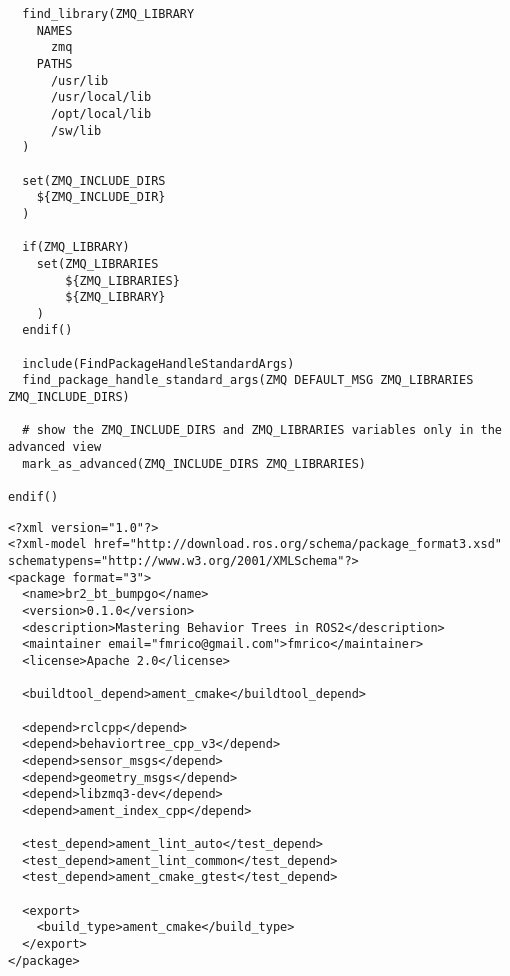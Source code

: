 \begin{tcolorbox}[sharp corners, colframe=gray!80, colback=LightGray, left=0pt, top=0pt, bottom=0pt, title=\texttt{br2\_bt\_bumpgo/cmake/FindZMQ.cmake}]
\begin{verbatim}
  find_library(ZMQ_LIBRARY
    NAMES
      zmq
    PATHS
      /usr/lib
      /usr/local/lib
      /opt/local/lib
      /sw/lib
  )

  set(ZMQ_INCLUDE_DIRS
    ${ZMQ_INCLUDE_DIR}
  )

  if(ZMQ_LIBRARY)
    set(ZMQ_LIBRARIES
        ${ZMQ_LIBRARIES}
        ${ZMQ_LIBRARY}
    )
  endif()

  include(FindPackageHandleStandardArgs)
  find_package_handle_standard_args(ZMQ DEFAULT_MSG ZMQ_LIBRARIES ZMQ_INCLUDE_DIRS)

  # show the ZMQ_INCLUDE_DIRS and ZMQ_LIBRARIES variables only in the advanced view
  mark_as_advanced(ZMQ_INCLUDE_DIRS ZMQ_LIBRARIES)

endif()

    \end{verbatim}
    \end{tcolorbox}
  \normalsize

 \footnotesize
\begin{tcolorbox}[sharp corners, colframe=gray!80, colback=LightGray, left=0pt, top=0pt, bottom=0pt, title=\texttt{br2\_bt\_bumpgo/package.xml}]
  \begin{verbatim}
<?xml version="1.0"?>
<?xml-model href="http://download.ros.org/schema/package_format3.xsd" schematypens="http://www.w3.org/2001/XMLSchema"?>
<package format="3">
  <name>br2_bt_bumpgo</name>
  <version>0.1.0</version>
  <description>Mastering Behavior Trees in ROS2</description>
  <maintainer email="fmrico@gmail.com">fmrico</maintainer>
  <license>Apache 2.0</license>

  <buildtool_depend>ament_cmake</buildtool_depend>

  <depend>rclcpp</depend>
  <depend>behaviortree_cpp_v3</depend>
  <depend>sensor_msgs</depend>
  <depend>geometry_msgs</depend>
  <depend>libzmq3-dev</depend>
  <depend>ament_index_cpp</depend>

  <test_depend>ament_lint_auto</test_depend>
  <test_depend>ament_lint_common</test_depend>
  <test_depend>ament_cmake_gtest</test_depend>

  <export>
    <build_type>ament_cmake</build_type>
  </export>
</package>
    \end{verbatim}
    \end{tcolorbox}
  \normalsize


